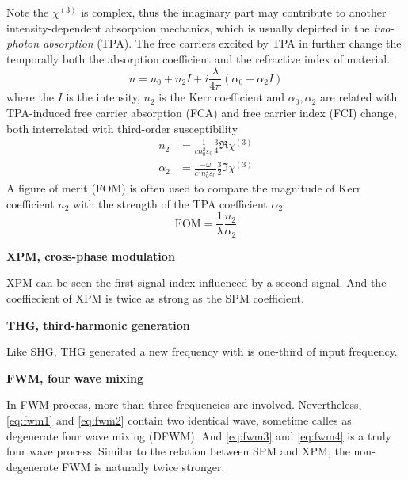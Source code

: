 Note the $\chi^{(3)}$ is complex, thus the imaginary part may contribute to another intensity-dependent absorption mechanics, which is usually depicted in the \textit{two-photon absorption} (TPA). The free carriers excited by TPA in further change the temporally both the absorption coefficient and the refractive index of material.
\begin{equation}\label{eq:spm-index}
    n = n_0 + n_2 I + i \frac{\lambda}{4\pi}(\alpha_0 + \alpha_2 I)
\end{equation}
where the $I$ is the intensity, $n_2$ is the Kerr coefficient and $\alpha_0, \alpha_2$ are related with TPA-induced free carrier absorption (FCA) and free carrier index (FCI) change, both interrelated with third-order susceptibility
\begin{align}
    n_2     &= \frac{1}{cn_0^2\varepsilon_0} \frac{3}{4} \Re{\chi^{(3)}} \\
    \alpha_2&= \frac{-\omega}{c^2n_0^2\varepsilon_0} \frac{3}{2} \Im{\chi^{(3)}}
\end{align}
A figure of merit (FOM) is often used to compare the magnitude of Kerr coefficient $n_2$ with the strength of the TPA coefficient $\alpha_2$
\begin{equation}
    \mathrm{FOM} = \frac{1}{\lambda} \frac{n_2}{\alpha_2}
\end{equation}

\bigskip
\noindent\textbf{XPM, cross-phase modulation} 

XPM can be seen the first signal index influenced by a second signal. And the coeffiecient of XPM is twice as strong as the SPM coefficient.

\bigskip
\noindent\textbf{THG, third-harmonic generation} 

Like SHG, THG generated a new frequency with is one-third of input frequency. 

\bigskip
\noindent\textbf{FWM, four wave mixing} 

In FWM process, more than three frequencies are involved. Nevertheless, \autoref{eq:fwm1} and \autoref{eq:fwm2} contain two identical wave, sometime calles as degenerate four wave mixing (DFWM). And \autoref{eq:fwm3} and \autoref{eq:fwm4} is a truly four wave process. Similar to the relation between SPM and XPM, the non-degenerate FWM is naturally twice stronger.

